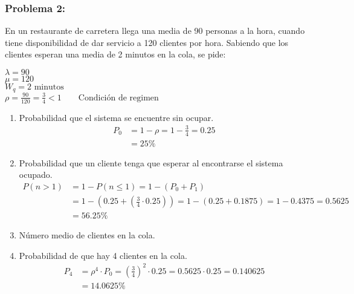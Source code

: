 \documentclass{templateNote}
\begin{document}
\subsubsection{Problema 2:}
En un restaurante de carretera llega una media de 90 personas a la hora, cuando tiene disponibilidad de dar servicio a 120 clientes por hora. Sabiendo que los clientes esperan una media de 2 minutos en la cola, se pide:
\begin{tcolorbox}[
    colframe=Celeste!100, %
    colback=Celeste!20,       %
    coltitle=white!100, %
    title=\textbf{Datos}, %
]
    $\lambda = 90$ \\
    $\mu = 120$ \\
    $W_q = 2 \text{ minutos}$ \\
    $\rho = \frac{90}{120} = \frac{3}{4} < 1 \qquad \text{Condici\'on de regimen}$
\end{tcolorbox}
\begin{enumerate}
    \renewcommand{\labelenumi}{\alph{enumi})}
    \item Probabilidad que el sistema se encuentre sin ocupar.
    \begin{align*}
        P_0 &= 1 - \rho = 1 - \frac{3}{4} = 0.25\\
        &= 25\%
    \end{align*}
    
    \item Probabilidad que un cliente tenga que esperar al encontrarse el sistema ocupado.
    \begin{align*}
        P(n > 1) &= 1 - P(n \leq 1) = 1 - (P_0 + P_1) \\
        &= 1 - (0.25 + (\frac{3}{4} \cdot 0.25)) = 1 - (0.25 + 0.1875) = 1 - 0.4375 = 0.5625 \\
        &= 56.25\%
    \end{align*}
    
    \item N\'umero medio de clientes en la cola.
    
    \item Probabilidad de que hay 4 clientes en la cola.
    \begin{align*}
        P_4 &= \rho^4 \cdot P_0 =\left(\frac{3}{4}\right)^2 \cdot 0.25 = 0.5625 \cdot 0.25 = 0.140625\\
        &= 14.0625\%
    \end{align*}
\end{enumerate}
\end{document}
